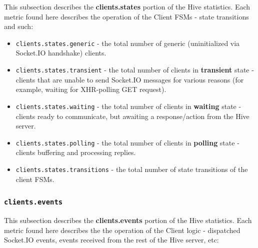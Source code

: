 \documentclass[a4paper]{article}
\begin{document}
This subsection describes the \textbf{clients.states} portion of the Hive statistics. Each metric found here describes the operation of the Client FSMs - state transitions and such:


\begin{itemize}
\item \texttt{clients.states.generic} - the total number of generic (uninitialized via Socket.IO handshake) clients.
\item \texttt{clients.states.transient} - the total number of clients in \textbf{transient} state - clients that are unable to send Socket.IO messages for various reasons (for example, waiting for XHR-polling GET request).
\item \texttt{clients.states.waiting} - the total number of clients in \textbf{waiting} state - clients ready to communicate, but awaiting a response/action from the Hive server.
\item \texttt{clients.states.polling} - the total number of clients in \textbf{polling} state - clients buffering and processing replies.
\item \texttt{clients.states.transitions} - the total number of state transitions of the client FSMs.
\end{itemize}
\subsubsection{\texttt{clients.events}}
\label{sec-4-2-7}

This subsection describes the \textbf{clients.events} portion of the Hive statistics. Each metric found here describes the the operation of the Client logic - dispatched Socket.IO events, events received from the rest of the Hive server, etc:
\end{document}
